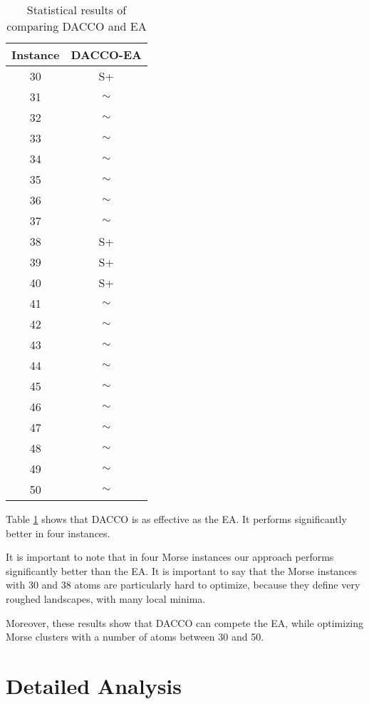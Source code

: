 			\pagebreak
			\begin{table}[!htdp]
					\label{tab:statistical_comparison_ea}
					\begin{center}
						\begin{tabular}{| c | c |}
							\hline
							\textbf{Instance} & \textbf{DACCO-EA} \\ \hline
							30 & S+ \\ \hline
							31 & $\sim$ \\ \hline
							32 & $\sim$ \\ \hline
							33 & $\sim$ \\ \hline
							34 & $\sim$ \\ \hline
							35 & $\sim$ \\ \hline
							36 & $\sim$ \\ \hline
							37 & $\sim$ \\ \hline
							38 & S+ \\ \hline
							39 & S+ \\ \hline
							40 & S+ \\\hline
							41 & $\sim$ \\ \hline
							42 & $\sim$ \\ \hline
							43 & $\sim$ \\ \hline
							44 & $\sim$ \\ \hline
							45 & $\sim$ \\ \hline
							46 & $\sim$ \\ \hline
							47 & $\sim$ \\ \hline
							48 & $\sim$ \\ \hline 
							49 & $\sim$ \\ \hline
							50 & $\sim$ \\ \hline
						\end{tabular}
						\caption{Statistical results of comparing DACCO and EA}
					\end{center}
			\end{table}
		Table \ref{tab:statistical_comparison_ea} shows that DACCO is as effective as the EA. It performs significantly better in four instances. 
		
		It is important to note that in four Morse instances our approach performs significantly better than the EA. It is important to say that the Morse instances with 30 and 38 atoms are particularly hard to optimize, because they define very roughed landscapes, with many local minima.
		
		Moreover, these results show that DACCO can compete the EA, while optimizing Morse clusters with a number of atoms between 30 and 50.
		
		\section{Detailed Analysis}
		\label{sec:detailed_analysis}
	
	

	
